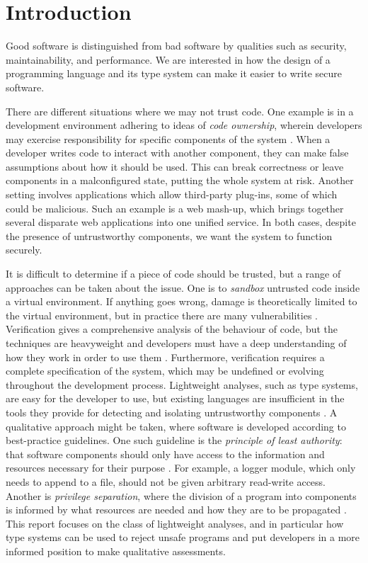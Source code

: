 
\section{Introduction}


Good software is distinguished from bad software by qualities such as security, maintainability, and performance. We are interested in how the design of a programming language and its type system can make it easier to write secure software.

There are different situations where we may not trust code. One example is in a development environment adhering to ideas of \textit{code ownership}, wherein developers may exercise responsibility for specific components of the system \cite{bird11}. When a developer writes code to interact with another component, they can make false assumptions about how it should be used. This can break correctness or leave components in a malconfigured state, putting the whole system at risk. Another setting involves applications which allow third-party plug-ins, some of which could be malicious. Such an example is a web mash-up, which brings together several disparate web applications into one unified service. In both cases, despite the presence of untrustworthy components, we want the system to function securely.

It is difficult to determine if a piece of code should be trusted, but a range of approaches can be taken about the issue. One is to \textit{sandbox} untrusted code inside a virtual environment. If anything goes wrong, damage is theoretically limited to the virtual environment, but in practice there are many vulnerabilities \cite{coker15, maass16, watson07, schreuders13}. Verification gives a comprehensive analysis of the behaviour of code, but the techniques are heavyweight and developers must have a deep understanding of how they work in order to use them \cite{kneuper97}. Furthermore, verification requires a complete specification of the system, which may be undefined or evolving throughout the development process. Lightweight analyses, such as type systems, are easy for the developer to use, but existing languages are insufficient in the tools they provide for detecting and isolating untrustworthy components \cite{chen07, ter-louw08}. A qualitative approach might be taken, where software is developed according to best-practice guidelines. One such guideline is the \textit{principle of least authority}: that software components should only have access to the information and resources necessary for their purpose \cite{saltzer74}. For example, a logger module, which only needs to append to a file, should not be given arbitrary read-write access. Another is \textit{privilege separation}, where the division of a program into components is informed by what resources are needed and how they are to be propagated \cite{saltzer75}. This report focuses on the class of lightweight analyses, and in particular how type systems can be used to reject unsafe programs and put developers in a more informed position to make qualitative assessments.

